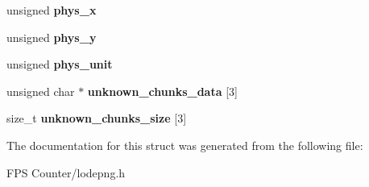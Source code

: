 \begin{DoxyCompactItemize}
unsigned {\bfseries phys\+\_\+x}
\item 
\mbox{\label{struct_lode_p_n_g_info_a52ad7a105244d00f1e91c489eaf53f97}} 
unsigned {\bfseries phys\+\_\+y}
\item 
\mbox{\label{struct_lode_p_n_g_info_ad6f2171d9f87716e5010f6c5352f9855}} 
unsigned {\bfseries phys\+\_\+unit}
\item 
\mbox{\label{struct_lode_p_n_g_info_a8347476da7fc2fc6af4ec7ed44b638c6}} 
unsigned char $\ast$ {\bfseries unknown\+\_\+chunks\+\_\+data} \mbox{[}3\mbox{]}
\item 
\mbox{\label{struct_lode_p_n_g_info_a25a81d760759bd0383ae5a81ba83911d}} 
size\+\_\+t {\bfseries unknown\+\_\+chunks\+\_\+size} \mbox{[}3\mbox{]}
\end{DoxyCompactItemize}


The documentation for this struct was generated from the following file\+:\begin{DoxyCompactItemize}
\item 
F\+P\+S Counter/lodepng.\+h\end{DoxyCompactItemize}
